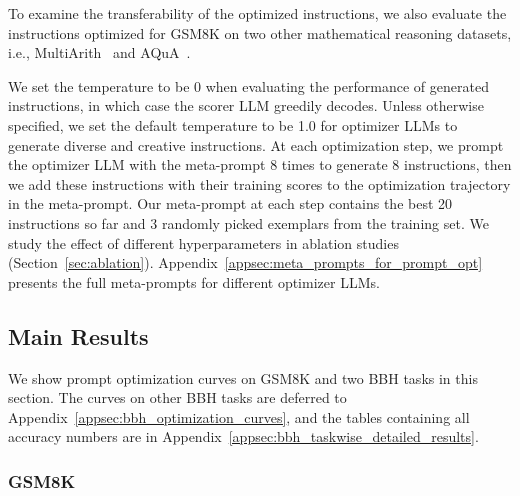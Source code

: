 To examine the transferability of the optimized instructions, we also evaluate the instructions optimized for GSM8K on two other mathematical reasoning datasets, i.e.,  MultiArith~\citep{roy2016solving} and AQuA~\citep{ling2017program}.

We set the temperature to be 0 when evaluating the performance of generated instructions, in which case the scorer LLM greedily decodes.
Unless otherwise specified, we set the default temperature to be 1.0 for optimizer LLMs to generate diverse and creative instructions.
At each optimization step, we prompt the optimizer LLM with the meta-prompt 8 times to generate 8 instructions, then we add these instructions with their training scores to the optimization trajectory in the meta-prompt.
Our meta-prompt at each step contains the best 20 instructions so far and 3 randomly picked exemplars from the training set.
We study the effect of different hyperparameters in ablation studies (Section~\ref{sec:ablation}). Appendix~\ref{appsec:meta_prompts_for_prompt_opt} presents the full meta-prompts for different optimizer LLMs.

\subsection{Main Results}
\label{sec:main_results}
We show prompt optimization curves on GSM8K and two BBH tasks in this section.
The curves on other BBH tasks are deferred to Appendix~\ref{appsec:bbh_optimization_curves}, and the tables containing all accuracy numbers are in Appendix~\ref{appsec:bbh_taskwise_detailed_results}.

\subsubsection{GSM8K}

